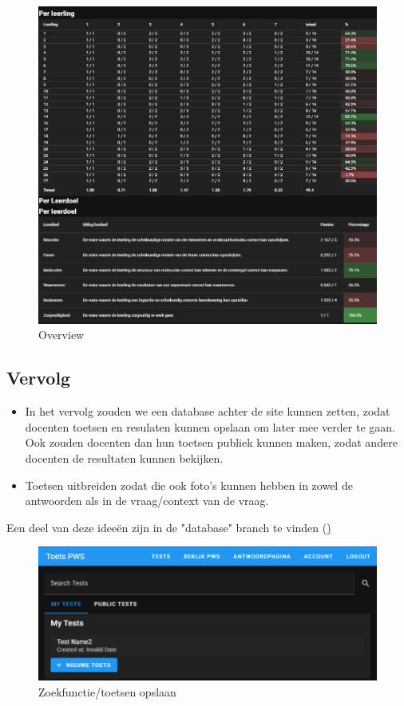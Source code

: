 \documentclass[12pt]{article}
\begin{document}
\begin{figure}[H]
    \centering
    \includegraphics[width=\linewidth]{./images/demo/analisys/overview.png}
    \caption{Overview}
    \label{fig:teacher-overview}
\end{figure}
\pagebreak
\subsection{Vervolg}
\begin{itemize}
    \item In het vervolg zouden we een database achter de site kunnen zetten, zodat docenten toetsen en resulaten kunnen opslaan om later mee verder te gaan. Ook zouden docenten dan hun toetsen publiek kunnen maken, zodat andere docenten de resultaten kunnen bekijken. 
    \item Toetsen uitbreiden zodat die ook foto's kunnen hebben in zowel de antwoorden als in de vraag/context van de vraag.
\end{itemize}
\noindent Een deel van deze ideeën zijn in de "database" branch te vinden (\href{https://github.com/TanteJossa/PWS-teacher-web-app/tree/database}) 
\begin{figure}[H]
    \centering
    \includegraphics[width=\linewidth]{./images/demo/browser.png}
    \caption{Zoekfunctie/toetsen opslaan}
    \label{fig:browser-preview}
\end{figure}
\end{document}
